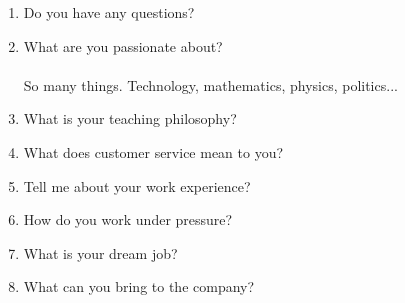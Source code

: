 \documentclass[12pt,a4paper,twoside]{article}
\begin{document}
\begin{enumerate}
		\item Do you have any questions?
		\item What are you passionate about?\\\\
		So many things. Technology, mathematics, physics, politics...
		\item What is your teaching philosophy?
		\item What does customer service mean to you?
		\item Tell me about your work experience?
		\item How do you work under pressure?
		\item What is your dream job?
		\item What can you bring to the company?
	\end{enumerate}
\end{document}
